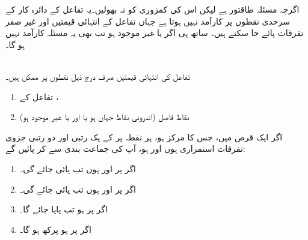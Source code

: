   اگرچہ مسئلہ    طاقتور  ہے لیکن  اس کی کمزوری کو  نہ بھولیں۔یہ تفاعل کے دائرہ کار کے سرحدی نقطوں پر کارآمد نہیں ہوتا ہے جہاں تفاعل کے انتہائی قیمتیں اور غیر صفر تفرقات پائے جا  سکتے   ہیں۔  ساتھ ہی  اگر  یا  غیر موجود ہو تب بھی یہ مسئلہ کارآمد نہیں ہو گا۔
 
\\
تفاعل  کی انتہائی قیمتیں صرف درج ذیل نقطوں پر ممکن ہیں۔
\begin{enumerate}[1.]
\item
تفاعل  کے ،
\item
نقاط فاصل (اندرونی نقاط جہاں  ہو یا  اور یا   غیر موجود ہو) 
\end{enumerate}
اگر ایک قرص  میں، جس کا مرکز  ہو، ہر نقطہ پر   کے یک رتبی اور دو رتبی جزوی تفرقات استمراری ہوں اور  ہو، آپ   کی  جماعت بندی  سے کر پائیں گے:
\begin{enumerate}[1.]
\item
اگر  پر  اور  ہوں تب پائی جائے گی۔
\item
اگر  پر  اور  ہوں تب  پائی جائے گی۔
\item
اگر  پر  ہو تب   پایا جائے گا۔
\item
اگر  پر  ہو پرکھ   ہو گا۔
\end{enumerate}
